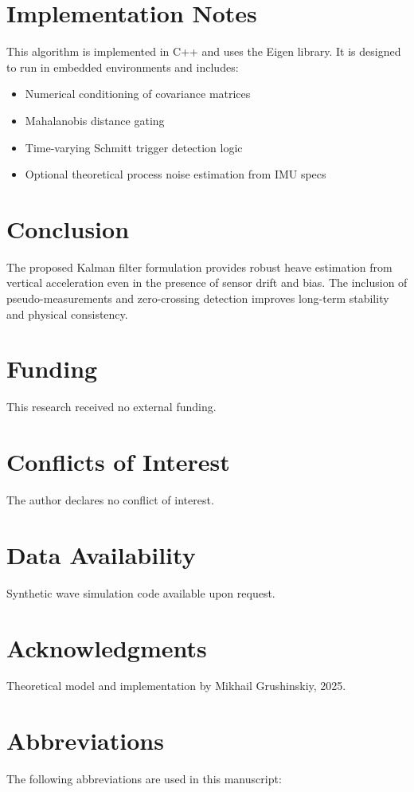 \documentclass[11pt,letterpaper]{article}
\begin{document}
\section{Implementation Notes}
This algorithm is implemented in C++ and uses the Eigen library. It is designed to run in embedded environments and includes:
\begin{itemize}
  \item Numerical conditioning of covariance matrices
  \item Mahalanobis distance gating
  \item Time-varying Schmitt trigger detection logic
  \item Optional theoretical process noise estimation from IMU specs
\end{itemize}

\section{Conclusion}
The proposed Kalman filter formulation provides robust heave estimation from vertical acceleration even in the presence of sensor drift and bias. The inclusion of pseudo-measurements and zero-crossing detection improves long-term stability and physical consistency.


\section*{Funding}
This research received no external funding.

\section*{Conflicts of Interest}
The author declares no conflict of interest.

\section*{Data Availability}
Synthetic wave simulation code available upon request.

\section*{Acknowledgments}
Theoretical model and implementation by Mikhail Grushinskiy, 2025.

\section*{Abbreviations}
The following abbreviations are used in this manuscript:
\end{document}
